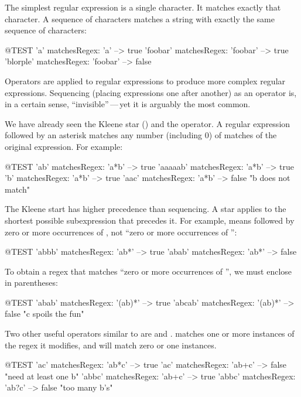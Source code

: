\documentclass[a4paper,10pt,twoside]{book}
\begin{document}
The simplest regular expression is a single character.  It matches exactly that character. A sequence of characters matches a string with exactly the same sequence of characters:
\begin{code}{@TEST}
'a' matchesRegex: 'a'                  --> true
'foobar' matchesRegex: 'foobar'  --> true
'blorple' matchesRegex: 'foobar' --> false
\end{code}

Operators are applied to regular expressions to
produce more complex regular expressions. Sequencing (placing expressions one
after another) as an operator is, in a certain sense, ``invisible''\,---\,yet it is
arguably the most common.

We have already seen the Kleene star (\ct{*}) and the \ct{+} operator.
A regular expression followed by an asterisk matches any number (including 0) of matches of the original expression. For example:
\begin{code}{@TEST}
'ab' matchesRegex: 'a*b'         --> true
'aaaaab' matchesRegex: 'a*b' --> true
'b' matchesRegex: 'a*b'           --> true
'aac' matchesRegex: 'a*b'	    --> false    "b does not match"
\end{code}

The Kleene start has higher precedence than sequencing. A star applies to the
shortest possible subexpression that precedes it. For example, 
means  followed by zero or more occurrences of , not ``zero or more
occurrences of '':
\begin{code}{@TEST}
'abbb' matchesRegex: 'ab*' --> true
'abab' matchesRegex: 'ab*' --> false
\end{code}

To obtain a regex that matches ``zero or more occurrences of '', we must enclose  in parentheses:
\begin{code}{@TEST}
'abab' matchesRegex: '(ab)*'   --> true
'abcab' matchesRegex: '(ab)*' --> false    "c spoils the fun"
\end{code}

Two other useful operators similar to \ct{*} are \ct{+} and .
\ct{+} matches one or more instances of the regex it modifies, and  will match zero or one instances.
\begin{code}{@TEST}
'ac' matchesRegex: 'ab*c'	   --> true
'ac' matchesRegex: 'ab+c'	  --> false    "need at least one b"
'abbc' matchesRegex: 'ab+c' --> true
'abbc' matchesRegex: 'ab?c' --> false    "too many b's"
\end{code}
\end{document}
